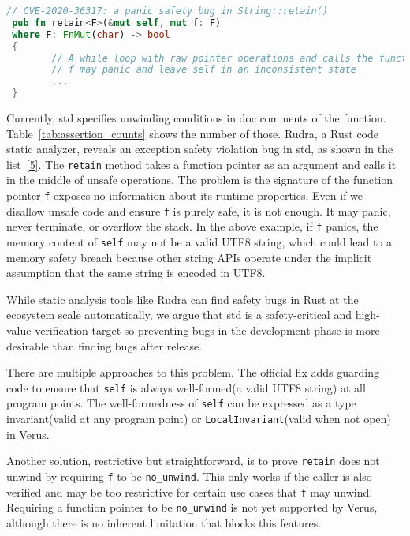 \documentclass[conference]{IEEEtran}
\begin{document}
\begin{lstlisting}[language=Rust,style=colouredRust, caption={An example of exception safety violation}, label = {5}]
// CVE-2020-36317: a panic safety bug in String::retain()
 pub fn retain<F>(&mut self, mut f: F)
 where F: FnMut(char) -> bool
 {
        // A while loop with raw pointer operations and calls the function f
        // f may panic and leave self in an inconsistent state
        ...
 }
\end{lstlisting}

Currently, std specifies unwinding conditions in doc comments of the function. Table~\ref{tab:assertion_counts} shows the number of those. Rudra\cite{Rudra}, a Rust code static analyzer, reveals an exception safety violation bug\cite{CVE-2020-36317} in std, as shown in the list~\ref{5}. The \texttt{retain} method takes a function pointer as an argument and calls it in the middle of unsafe operations. The problem is the signature of the function pointer \texttt{f} exposes no information about its runtime properties. Even if we disallow unsafe code and ensure \texttt{f} is purely safe, it is not enough. It may panic, never terminate, or overflow the stack. In the above example, if \texttt{f} panics, the memory content of \texttt{self} may not be a valid UTF8 string, which could lead to a memory safety breach because other string APIs operate under the implicit assumption that the same string is encoded in UTF8.  

While static analysis tools like Rudra can find safety bugs in Rust at the ecosystem scale automatically, we argue that std is a safety-critical and high-value verification target so preventing bugs in the development phase is more desirable than finding bugs after release. 

There are multiple approaches to this problem. The official fix adds guarding code to ensure that \texttt{self} is always well-formed(a valid UTF8 string) at all program points. The well-formedness of \texttt{self} can be expressed as a type invariant(valid at any program point) or \texttt{LocalInvariant}(valid when not open) in Verus. 

Another solution, restrictive but straightforward, is to prove \texttt{retain} does not unwind by requiring \texttt{f} to be \texttt{no\_unwind}. This only works if the caller is also verified and may be too restrictive for certain use cases that \texttt{f} may unwind. Requiring a function pointer to be \texttt{no\_unwind} is not yet supported by Verus, although there is no inherent limitation that blocks this features.   
\end{document}
